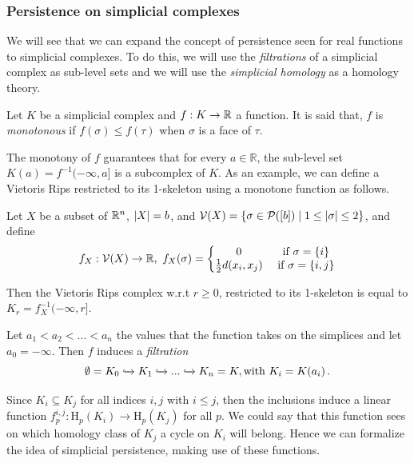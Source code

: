 \documentclass[../main.tex]{subfiles}
\begin{document}
\subsubsection*{Persistence on simplicial complexes}
We will see that we can expand the concept of persistence seen for real functions to simplicial complexes. To do this, we will use the \emph{filtrations} of a simplicial complex as sub-level sets and we will use the \emph{simplicial homology} as a homology theory.

\begin{definition}
Let $K$ be a simplicial complex and $f: K \to \mathbb{R}$ a function. It is said that, $f$ is \emph{monotonous} if $f(\sigma) \leq f(\tau) $ when $\sigma$ is a face of $\tau$.
\end{definition}
\begin{sloppypar}
The monotony of $f$ guarantees that for every $a \in \mathbb {R}$, the sub-level set ${K(a) = f^{-1} (-\infty, a]} $ is a subcomplex of $K$. As an example, we can define a Vietoris Rips restricted to its 1-skeleton using a monotone function as follows.
\end{sloppypar}

\begin{proposition}
Let $X$ be a subset of $\mathbb{R}^n$, $\left\lvert X \right\rvert=b$, and $\mathcal{V}(X) = \{\sigma \in \mathcal{P}([b]) \mid 1 \leq \left\lvert \sigma \right\rvert \leq 2\}$, and define
\[
f_X: \mathcal{V}(X) \to \mathbb{R},\ f_X(\sigma) = \left\{\begin{matrix}
0 &  \text{ if } \sigma=\{i\}\\
\frac{1}{2}d(x_i, x_j) & \text{ if } \sigma=\{i,j\}\\
\end{matrix}\right. 
\]

Then the Vietoris Rips complex w.r.t $r\geq 0 $, restricted to its 1-skeleton is equal to $K_r=f_X^{-1}(-\infty, r]$.
\end{proposition}


\begin{definition}
Let $a_1 <a_2 <... <a_n$ the values that the function takes on the simplices and let $ a_0 = -\infty$. Then $f$ induces a \emph{filtration}
\[
\emptyset = K_0 \xhookrightarrow{} K_1 \xhookrightarrow{} ... \xhookrightarrow{} K_n = K, \text{with } K_i = K (a_i) \,.
\]
\end{definition}
 
Since $K_i \subseteq K_j$ for all indices $i,j$ with $i \leq j$, then the inclusions induce a linear function $f^{i,j}_p: \text{H}_p(K_i) \to \text{H}_p(K_j)$ for all $p$. We could say that this function sees on which homology class of $K_j$ a cycle on $K_i$ will belong. Hence we can formalize the idea of simplicial persistence, making use of these functions.
\end{document}
